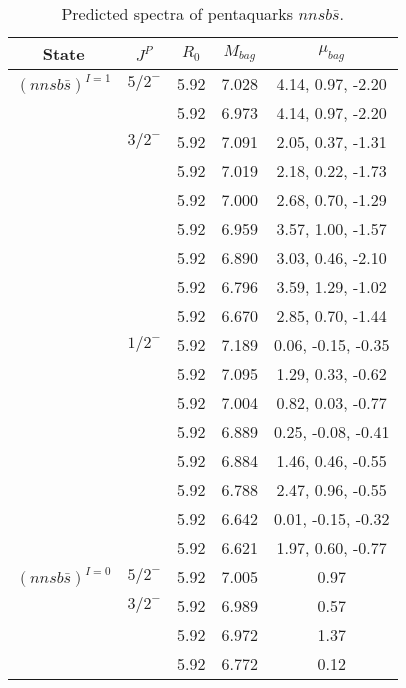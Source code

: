 \documentclass[prd,twocolumn,floatfix,nofootinbib]{revtex4}
\begin{document}
\renewcommand{\tabcolsep}{0.5cm}
\renewcommand{\arraystretch}{1.2}
\begin{table*}[!htbp]
    \caption{Predicted spectra of pentaquarks $nnsb\bar{s}$.}
    \begin{tabular}{ccccc}
        \hline\hline
        {\rm State} &$J^{P}$ &$R_{0}$ &$M_{bag}$ &$\mu_{bag}$ \\ \hline
        ${(nnsb\bar{s})}^{I=1}$
            &${5/2}^{-}$    &5.92   &7.028  &4.14, 0.97, -2.20 \\
            &               &5.92   &6.973  &4.14, 0.97, -2.20 \\
            &${3/2}^{-}$    &5.92   &7.091  &2.05, 0.37, -1.31 \\
            &               &5.92   &7.019  &2.18, 0.22, -1.73 \\
            &               &5.92   &7.000  &2.68, 0.70, -1.29 \\
            &               &5.92   &6.959  &3.57, 1.00, -1.57 \\
            &               &5.92   &6.890  &3.03, 0.46, -2.10 \\
            &               &5.92   &6.796  &3.59, 1.29, -1.02 \\
            &               &5.92   &6.670  &2.85, 0.70, -1.44 \\
            &${1/2}^{-}$    &5.92   &7.189  &0.06, -0.15, -0.35 \\
            &               &5.92   &7.095  &1.29, 0.33, -0.62 \\
            &               &5.92   &7.004  &0.82, 0.03, -0.77 \\
            &               &5.92   &6.889  &0.25, -0.08, -0.41 \\
            &               &5.92   &6.884  &1.46, 0.46, -0.55 \\
            &               &5.92   &6.788  &2.47, 0.96, -0.55 \\
            &               &5.92   &6.642  &0.01, -0.15, -0.32 \\
            &               &5.92   &6.621  &1.97, 0.60, -0.77 \\
        ${(nnsb\bar{s})}^{I=0}$
            &${5/2}^{-}$    &5.92   &7.005  &0.97 \\
            &${3/2}^{-}$    &5.92   &6.989  &0.57 \\
            &               &5.92   &6.972  &1.37 \\
            &               &5.92   &6.772  &0.12 \\

\end{tabular}
\end{table*}
\end{document}
